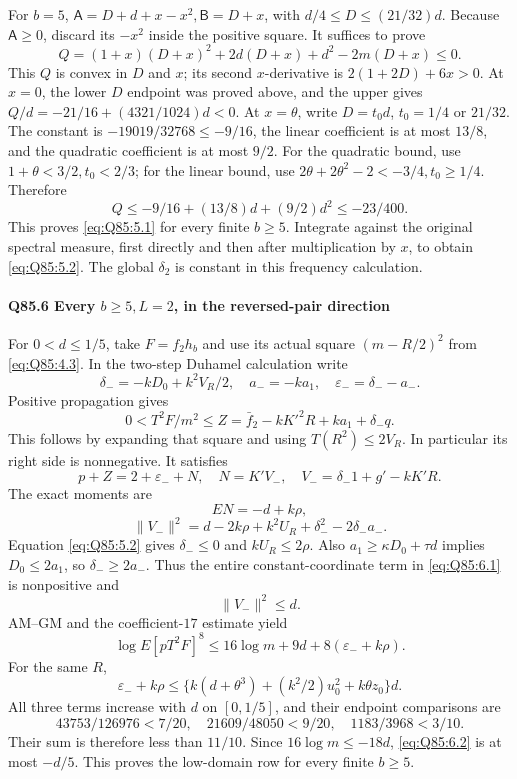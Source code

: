 For \(b=\allowbreak 5\),
\(\mathsf A=\allowbreak D+d+x-x^2,\allowbreak \mathsf B=\allowbreak D+x\), with
\(d/4\le\allowbreak  D\le\allowbreak (21/32)d\).
Because \(\mathsf A\ge\allowbreak 0\), discard its \(-x^2\) inside the positive square.
It suffices to prove
\[
 Q=(1+x)(D+x)^2+2d(D+x)+d^2-2m(D+x)\le0.             \tag{Q85.5.7}\label{eq:Q85:5.7}
\]
This \(Q\) is convex in \(D\) and \(x\); its second \(x\)-derivative is
\(2(1+2D)+6x>\allowbreak 0\).
At \(x=\allowbreak 0\), the lower \(D\) endpoint was proved above, and the upper gives
\(Q/d=\allowbreak -21/16+(4321/1024)d<\allowbreak 0\).
At \(x=\allowbreak \theta\), write \(D=\allowbreak t_0d\), \(t_0=\allowbreak 1/4\) or \(21/32\).
The constant is \(-19019/32768\le\allowbreak -9/16\), the linear coefficient is at most \(13/8\), and the quadratic coefficient is at most \(9/2\).
For the quadratic bound, use \(1+\theta<\allowbreak 3/2,\allowbreak t_0<\allowbreak 2/3\);
for the linear bound, use \(2\theta+2\theta^2-2<\allowbreak -3/4,\allowbreak t_0\ge\allowbreak 1/4\).
Therefore
\[
 Q\le-9/16+(13/8)d+(9/2)d^2\le-23/400.
\]
This proves \eqref{eq:Q85:5.1} for every finite \(b\ge\allowbreak 5\).
Integrate against the original spectral measure, first directly and then after multiplication by \(x\), to obtain \eqref{eq:Q85:5.2}.
The global \(\delta_2\) is constant in this frequency calculation.

\paragraph{Q85.6 Every \(b\ge\allowbreak 5,\allowbreak L=\allowbreak 2\), in the reversed-pair direction}
For \(0<\allowbreak d\le\allowbreak 1/5\), take \(F=\allowbreak f_2h_b\) and use its actual square
\((m-R/2)^2\) from \eqref{eq:Q85:4.3}.
In the two-step Duhamel calculation write
\[
 \delta_-=-kD_0+k^2V_R/2,\quad a_-=-ka_1,
 \quad\varepsilon_-=\delta_--a_-.
\]
Positive propagation gives
\[
 0<T^2F/m^2\le Z=\bar f_2-kK'^2R+ka_1+\delta_-q.
\]
This follows by expanding that square and using \(T(R^2)\le\allowbreak 2V_R\).
In particular its right side is nonnegative. It satisfies
\[
 p+Z=2+\varepsilon_-+N,
 \quad N=K'V_-,\quad V_-=\delta_-1+g'-kK'R.
\]
The exact moments are
\[
 EN=-d+k\rho,
\]
\[
 \|V_-\|^2=d-2k\rho+k^2U_R+\delta_-^2-2\delta_-a_-.
                                                               \tag{Q85.6.1}\label{eq:Q85:6.1}
\]
Equation \eqref{eq:Q85:5.2} gives \(\delta_-\le\allowbreak 0\) and \(kU_R\le\allowbreak 2\rho\).
Also \(a_1\ge\allowbreak \kappa D_0+\tau d\) implies \(D_0\le\allowbreak 2a_1\), so
\(\delta_-\ge\allowbreak 2a_-\).
Thus the entire constant-coordinate term in \eqref{eq:Q85:6.1} is nonpositive and
\[
 \|V_-\|^2\le d.
\]
AM--GM and the coefficient-\(17\) estimate yield
\[
 \log E[pT^2F]^8
 \le16\log m+9d+8(\varepsilon_-+k\rho).              \tag{Q85.6.2}\label{eq:Q85:6.2}
\]
For the same \(R\),
\[
 \varepsilon_-+k\rho
 \le \{k(d+\theta^3)+(k^2/2)u_0^2+k\theta z_0\}d.
\]
All three terms increase with \(d\) on \([0,\allowbreak 1/5]\), and their endpoint comparisons are
\[
 43753/126976<7/20,\quad
 21609/48050<9/20,\quad
 1183/3968<3/10.
\]
Their sum is therefore less than \(11/10\).
Since \(16\log m\le\allowbreak -18d\), \eqref{eq:Q85:6.2} is at most \(-d/5\).
This proves the low-domain row for every finite \(b\ge\allowbreak 5\).

